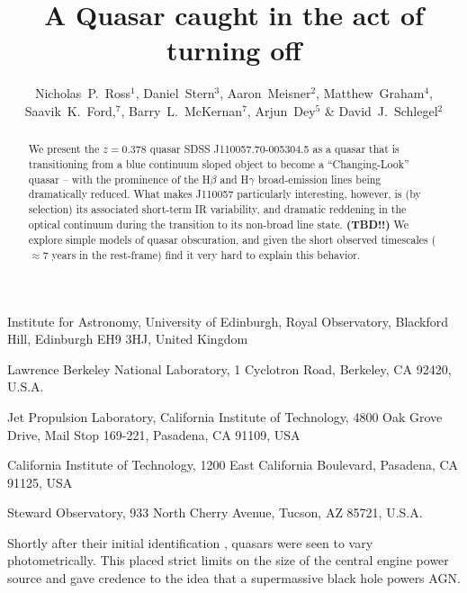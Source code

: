 \documentclass{nature}
\title{A Quasar caught in the act of turning off}
\author{Nicholas~P.~Ross$^{1}$, Daniel~Stern$^{3}$, Aaron~Meisner$^{2}$, 
Matthew~Graham$^{4}$, Saavik~K.~Ford,$^{7}$, Barry~L.~McKernan$^{7}$,
Arjun~Dey$^{5}$ \& David~J.~Schlegel$^{2}$}
\begin{document}
\maketitle

\begin{affiliations}
  \item Institute for Astronomy, University of Edinburgh, Royal Observatory, Blackford Hill, Edinburgh EH9 3HJ, United Kingdom 
  \item Lawrence Berkeley National Laboratory, 1 Cyclotron Road, Berkeley, CA 92420, U.S.A. 
  \item Jet Propulsion Laboratory, California Institute of Technology, 4800 Oak Grove Drive, Mail Stop 169-221, Pasadena, CA 91109, USA 
  \item California Institute of Technology, 1200 East California Boulevard, Pasadena, CA 91125, USA
  \item Steward Observatory, 933 North Cherry Avenue, Tucson, AZ 85721, U.S.A.
\end{affiliations}


\begin{abstract}
We present the $z=0.378$ quasar SDSS J110057.70-005304.5 as a quasar
that is transitioning from a blue continuum sloped object to become a
``Changing-Look'' quasar -- with the prominence of the H$\beta$ and
H$\gamma$ broad-emission lines being dramatically reduced. What makes
J110057 particularly interesting, however, is (by selection) its
associated short-term IR variability, and dramatic reddening in the
optical continuum during the transition to its non-broad line state.
{\bf (TBD!!)} We explore simple models of quasar obscuration, and
given the short observed timescales ($\approx$7 years in the rest-frame) 
find it very hard to explain this behavior.
\end{abstract}




Shortly after their initial identification \citep{Schmidt63, Hazard63}, quasars were 
seen to vary photometrically. This placed strict limits on the size of the 
central engine power source and gave credence to the idea that a 
supermassive black hole powers AGN. 
\end{document}
